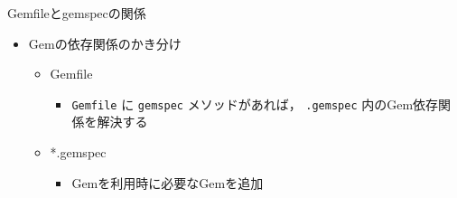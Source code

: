 \documentclass[t, aspectratio=169]{beamer}
\begin{document}
\begin{frame}[fragile,label=sec-4-3-6]{Gemfileとgemspecの関係}
 \begin{itemize}
\item Gemの依存関係のかき分け
\begin{itemize}
\item Gemfile
\begin{itemize}
\item \texttt{Gemfile} に \texttt{gemspec} メソッドがあれば， \texttt{.gemspec} 内のGem依存関係を解決する
\end{itemize}
\item *.gemspec
\begin{itemize}
\item Gemを利用時に必要なGemを追加
\end{itemize}
\end{itemize}
\end{itemize}
\end{frame}
\end{document}

